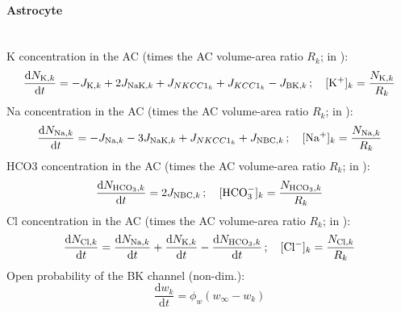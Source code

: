\paragraph{Astrocyte}~\\
%
\gls{K} concentration in the AC  (times the AC volume-area ratio $R_k$; in \uMm):
\begin{equation} \label{eq:KInt}
\dfrac{\mathrm{d}N_{\text{K},k}}{\mathrm{d}t}=- J_{\text{K},k} + 2 J_{\text{NaK},k} + J_{NKCC1_{k}} +  J_{KCC1_{k}} - J_{\text{BK},k} \,; \text{~~~} [\text{K$^+$}]_k = \frac{N_{\text{K},k}}{R_k}
\end{equation}
%
\gls{Na} concentration in the AC  (times the AC volume-area ratio $R_k$; in \uMm):
\begin{equation} \label{eq:NaInt}
\dfrac{\mathrm{d}N_{\text{Na},k}}{\mathrm{d}t}=-J_{\text{Na},k} - 3 J_{\text{NaK},k} + J_{NKCC1_{k}} +  J_{\text{NBC},k}\,; \text{~~~} [\text{Na$^+$}]_k = \frac{N_{\text{Na},k}}{R_k}
\end{equation}
%
\gls{HCO3} concentration in the AC  (times the AC volume-area ratio $R_k$; in \uMm):
\begin{equation} \label{eq:HCOInt}
\dfrac{\mathrm{d}N_{\text{HCO}_3,k}}{\mathrm{d}t}= 2 J_{\text{NBC},k}\,; \text{~~~} [\text{HCO$_3^-$}]_k = \frac{N_{\text{HCO}_3,k}}{R_k}
\end{equation}
%
\gls{Cl} concentration in the AC  (times the AC volume-area ratio $R_k$; in \uMm):
\begin{equation} \label{eq:ClInt}
\dfrac{\mathrm{d}N_{\text{Cl},k}}{\mathrm{d}t}= \dfrac{\mathrm{d}N_{\text{Na},k}}{\mathrm{d}t} + \dfrac{\mathrm{d}N_{\text{K},k}}{\mathrm{d}t} - \dfrac{\mathrm{d}N_{\text{HCO}_3,k}}{\mathrm{d}t}\,; \text{~~~} [\text{Cl$^-$}]_k = \frac{N_{\text{Cl},k}}{R_k}
\end{equation}
%
Open probability of the BK channel (non-dim.):
\begin{equation} \label{eq:dwkdt}
\frac{\mathrm{d}w_{k}}{\mathrm{d}t} = \phi_{w} \left(w_{\infty}-w_{k} \right) 
\end{equation}
%
